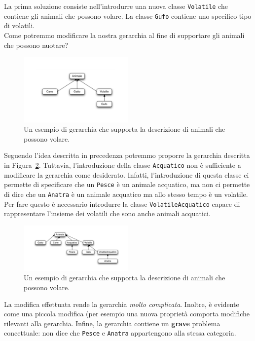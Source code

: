 \documentclass{article}
\begin{document}
La prima soluzione consiste nell'introdurre una nuova classe \texttt{Volatile} che contiene gli animali che possono volare. La classe \texttt{Gufo} contiene uno specifico tipo di volatili. \\
Come potremmo modificare la nostra gerarchia al fine di supportare gli animali che possono nuotare?
\begin{figure}[h!]
  \centering
    \includegraphics[width=0.5\textwidth]{gerarchia2.pdf}
      \caption{Un esempio di gerarchia che supporta la descrizione di animali che possono volare.}
      \label{Fig:gerarchy3}
\end{figure}
Seguendo l'idea descritta in precedenza potremmo proporre la gerarchia descritta in Figura~\ref{Fig:gerarchy4}. Tuttavia, l'introduzione della classe \texttt{Acquatico} non \`e sufficiente a modificare la gerarchia come desiderato. Infatti, l'introduzione di questa classe ci permette di specificare che un \texttt{Pesce} \`e un animale acquatico, ma non ci permette di dire che un \texttt{Anatra} \`e un animale acquatico ma allo stesso tempo \`e un volatile. Per fare questo \`e necessario introdurre la classe \texttt{VolatileAcquatico} capace di rappresentare l'insieme dei volatili che sono anche animali acquatici.
\begin{figure}[h!]
  \centering
    \includegraphics[width=0.5\textwidth]{gerarchia3.pdf}
      \caption{Un esempio di gerarchia che supporta la descrizione di animali che possono volare.}
      \label{Fig:gerarchy4}
\end{figure}
La modifica effettuata rende la gerarchia \emph{molto complicata}. Inoltre, \`e evidente come una piccola modifica (per esempio una nuova  propriet\`a comporta modifiche rilevanti alla gerarchia. Infine, la gerarchia contiene un \textbf{grave} problema concettuale: non dice che \texttt{Pesce} e \texttt{Anatra} appartengono alla stessa categoria.
\end{document}
